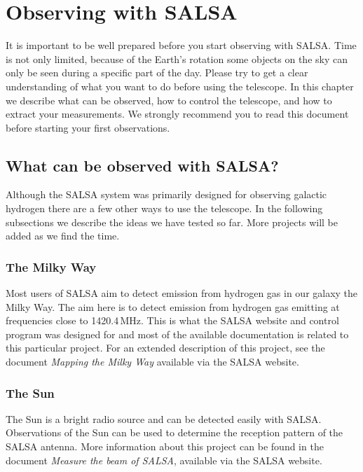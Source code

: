 \chapter{Observing with SALSA}
It is important to be well prepared before you start observing with SALSA.
Time is not only limited, because of the Earth's rotation some objects on the
sky can only be seen during a specific part of the day.  Please try to get a
clear understanding of what you want to do before using the telescope.  In this
chapter we describe what can be observed, how to control the telescope, and how
to extract your measurements. We strongly recommend you to read this document
before starting your first observations. 

\section{What can be observed with SALSA?}
Although the SALSA system was primarily designed for observing galactic
hydrogen there are a few other ways to use the telescope. In the following
subsections we describe the ideas we have tested so far. More projects
will be added as we find the time.

\subsection{The Milky Way}
Most users of SALSA aim to detect emission from hydrogen gas in our galaxy the
Milky Way.  The aim here is to detect emission from hydrogen gas emitting at
frequencies close to 1420.4\,MHz.  This is what the SALSA website and control
program was designed for and most of the available documentation is related to
this particular project. For an extended description of this project, see the
document \emph{Mapping the Milky Way} available via the SALSA website.

\subsection{The Sun}
The Sun is a bright radio source and can be detected easily with SALSA. 
Observations of the Sun can be used to determine the reception pattern
of the SALSA antenna. More information about this project can be found
in the document \emph{Measure the beam of SALSA}, available via the SALSA
website.

